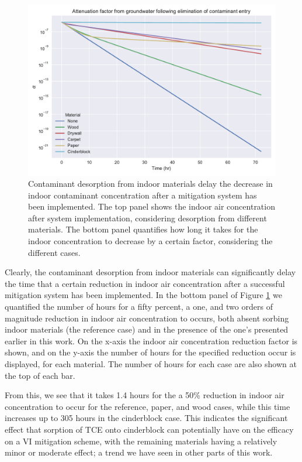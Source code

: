 \begin{figure}[!htb]
  \includegraphics[width=\textwidth]{sorption_mitigation.pdf}
  \caption{Contaminant desorption from indoor materials delay the decrease in indoor contaminant concentration after a mitigation system has been implemented. The top panel shows the indoor air concentration after system implementation, considering desorption from different materials. The bottom panel quantifies how long it takes for the indoor concentration to decrease by a certain factor, considering the different cases.}
  \label{fig:sorption_mitigation}
\end{figure}

Clearly, the contaminant desorption from indoor materials can significantly delay the time that a certain reduction in indoor air concentration after a successful mitigation system has been implemented.
In the bottom panel of Figure \ref{fig:sorption_mitigation} we quantified the number of hours for a fifty percent, a one, and two orders of magnitude reduction in indoor air concentration to occurs, both absent sorbing indoor materials (the reference case) and in the presence of the one's presented earlier in this work.
On the x-axis the indoor air concentration reduction factor is shown, and on the y-axis the number of hours for the specified reduction occur is displayed, for each material.
The number of hours for each case are also shown at the top of each bar.\par

From this, we see that it takes 1.4 hours for the a 50\% reduction in indoor air concentration to occur for the reference, paper, and wood cases, while this time increases up to 305 hours in the cinderblock case.
This indicates the significant effect that sorption of TCE onto cinderblock can potentially have on the efficacy on a VI mitigation scheme, with the remaining materials having a relatively minor or moderate effect; a trend we have seen in other parts of this work.\par
